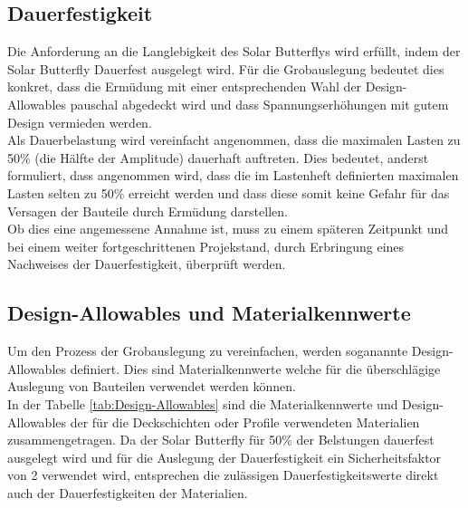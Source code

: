 \subsection{Dauerfestigkeit}
Die Anforderung an die Langlebigkeit des Solar Butterflys wird erfüllt, indem der Solar Butterfly Dauerfest ausgelegt wird. Für die Grobauslegung bedeutet dies konkret, dass die Ermüdung mit einer entsprechenden Wahl der Design-Allowables pauschal abgedeckt wird und dass Spannungserhöhungen mit gutem Design vermieden werden.\\
Als Dauerbelastung wird vereinfacht angenommen, dass die maximalen Lasten zu 50\% (die Hälfte der Amplitude) dauerhaft auftreten. Dies bedeutet, anderst formuliert, dass angenommen wird, dass die im Lastenheft definierten maximalen Lasten selten zu 50\% erreicht werden und dass diese somit keine Gefahr für das Versagen der Bauteile durch Ermüdung darstellen.\\
Ob dies eine angemessene Annahme ist, muss zu einem späteren Zeitpunkt und bei einem weiter fortgeschrittenen Projekstand, durch Erbringung eines Nachweises der Dauerfestigkeit, überprüft werden.

\subsection{Design-Allowables und Materialkennwerte}
Um den Prozess der Grobauslegung zu vereinfachen, werden soganannte Design-Allowables definiert. Dies sind Materialkennwerte welche für die überschlägige Auslegung von Bauteilen verwendet werden können.\\
In der Tabelle \ref{tab:Design-Allowables} sind die Materialkennwerte und Design-Allowables der für die Deckschichten oder Profile verwendeten Materialien zusammengetragen. Da der Solar Butterfly für 50\% der Belstungen dauerfest ausgelegt wird und für die Auslegung der Dauerfestigkeit ein Sicherheitsfaktor von 2 verwendet wird, entsprechen die zulässigen Dauerfestigkeitswerte direkt auch der Dauerfestigkeiten der Materialien.\\

